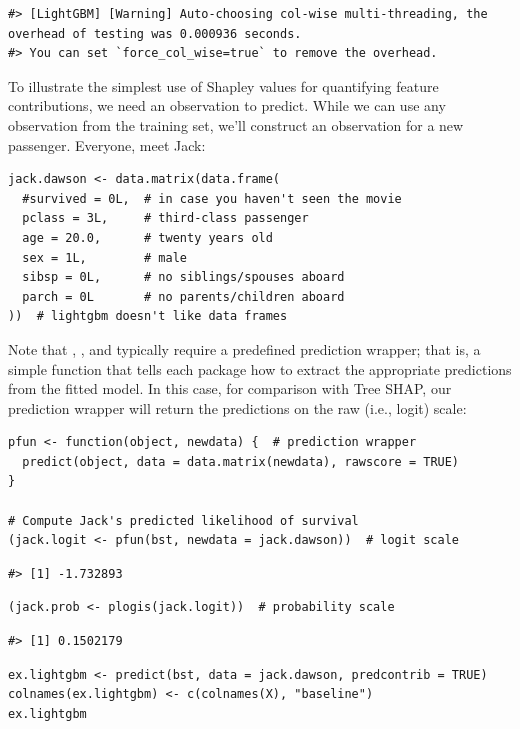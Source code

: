 \begin{verbatim}
#> [LightGBM] [Warning] Auto-choosing col-wise multi-threading, the overhead of testing was 0.000936 seconds.
#> You can set `force_col_wise=true` to remove the overhead.
\end{verbatim}

To illustrate the simplest use of Shapley values for quantifying feature contributions, we need an observation to predict. While we can use any observation from the training set, we'll construct an observation for a new passenger. Everyone, meet Jack:

\begin{verbatim}
jack.dawson <- data.matrix(data.frame(
  #survived = 0L,  # in case you haven't seen the movie
  pclass = 3L,     # third-class passenger
  age = 20.0,      # twenty years old
  sex = 1L,        # male
  sibsp = 0L,      # no siblings/spouses aboard
  parch = 0L       # no parents/children aboard
))  # lightgbm doesn't like data frames
\end{verbatim}

Note that , , and  typically require a predefined prediction wrapper; that is, a simple function that tells each package how to extract the appropriate predictions from the fitted model. In this case, for comparison with Tree SHAP, our prediction wrapper will return the predictions on the raw (i.e., logit) scale:

\begin{verbatim}
pfun <- function(object, newdata) {  # prediction wrapper
  predict(object, data = data.matrix(newdata), rawscore = TRUE)
}

# Compute Jack's predicted likelihood of survival
(jack.logit <- pfun(bst, newdata = jack.dawson))  # logit scale
\end{verbatim}

\begin{verbatim}
#> [1] -1.732893
\end{verbatim}

\begin{verbatim}
(jack.prob <- plogis(jack.logit))  # probability scale
\end{verbatim}

\begin{verbatim}
#> [1] 0.1502179
\end{verbatim}

\begin{verbatim}
ex.lightgbm <- predict(bst, data = jack.dawson, predcontrib = TRUE)
colnames(ex.lightgbm) <- c(colnames(X), "baseline")
ex.lightgbm
\end{verbatim}

